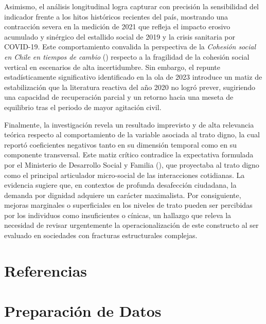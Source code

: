 \documentclass[
  spanish,
  a4paper,
  oneside]{scrbook}
\begin{document}
Asimismo, el análisis longitudinal logra capturar con precisión la
sensibilidad del indicador frente a los hitos históricos recientes del
país, mostrando una contracción severa en la medición de 2021 que
refleja el impacto erosivo acumulado y sinérgico del estallido social de
2019 y la crisis sanitaria por COVID-19. Este comportamiento convalida
la perspectiva de la \emph{{Cohesión social en Chile en tiempos de
cambio}} () respecto a la fragilidad
de la cohesión social vertical en escenarios de alta incertidumbre. Sin
embargo, el repunte estadísticamente significativo identificado en la
ola de 2023 introduce un matiz de estabilización que la literatura
reactiva del año 2020 no logró prever, sugiriendo una capacidad de
recuperación parcial y un retorno hacia una meseta de equilibrio tras el
periodo de mayor agitación civil.

Finalmente, la investigación revela un resultado imprevisto y de alta
relevancia teórica respecto al comportamiento de la variable asociada al
trato digno, la cual reportó coeficientes negativos tanto en su
dimensión temporal como en su componente transversal. Este matiz crítico
contradice la expectativa formulada por el Ministerio de Desarrollo
Social y Familia
(),
que proyectaba al trato digno como el principal articulador micro-social
de las interacciones cotidianas. La evidencia sugiere que, en contextos
de profunda desafección ciudadana, la demanda por dignidad adquiere un
carácter maximalista. Por consiguiente, mejoras marginales o
superficiales en los niveles de trato pueden ser percibidas por los
individuos como insuficientes o cínicas, un hallazgo que releva la
necesidad de revisar urgentemente la operacionalización de este
constructo al ser evaluado en sociedades con fracturas estructurales
complejas.


\chapter{Referencias}\label{referencias}

\cleardoublepage
{}
{}
\appendix

\chapter{Preparación de Datos}\label{preparaciuxf3n-de-datos}
\end{document}
